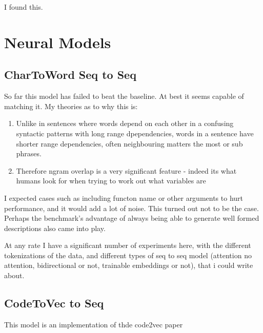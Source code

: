 I found this.



\section{Neural Models} %
\label{sec:neural_models}

\subsection{CharToWord Seq to Seq} %
\label{sub:chartoword_seq_to_seq}

So far this model has failed to beat the baseline. At best it seems capable of matching it. My theories as to why this is:
 \begin{enumerate}
     \item Unlike in sentences where words depend on each other in a confusing syntactic patterns with long range dpependencies, words in a sentence have shorter range dependencies, often neighbouring matters the most or sub phrases.
     \item Therefore ngram overlap is a very significant feature - indeed its what humans look for when trying to work out what variables are
 \end{enumerate}

 I expected cases such as including functon name or other arguments to hurt performance, and it would add a lot of noise. This turned out not to be the case. Perhaps the benchmark's advantage of always being able to generate well formed descriptions also came into play.

 At any rate I have a significant number of experiments here, with the different tokenizations of the data, and different types of seq to seq model (attention no attention, bidirectional or not, trainable embeddings or not), that i could write about.

 \subsection{CodeToVec to Seq} %
 \label{sub:codetovec}

 This model is an implementation of thde code2vec paper 
 







